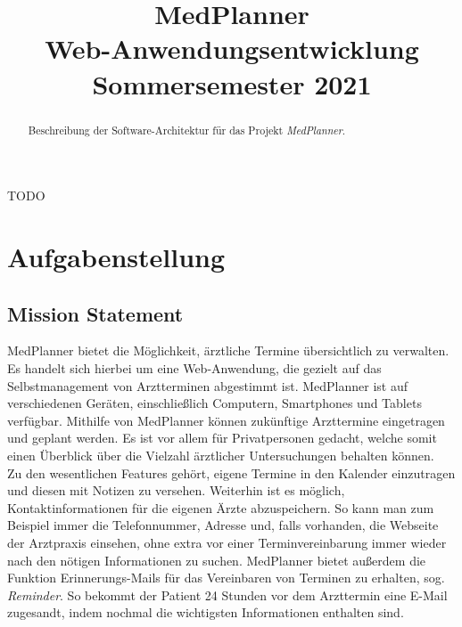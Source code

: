 \documentclass[conference]{IEEEtran}
\begin{document}
\title{MedPlanner\\
{\large Web-Anwendungsentwicklung Sommersemester 2021}
}

\author{
\and
{}
\and
{}
\and
{}
\and
{}
}

\maketitle

\begin{abstract}
Beschreibung der Software-Architektur für das Projekt \textit{MedPlanner}.
\end{abstract}

\begin{IEEEkeywords}
TODO
\end{IEEEkeywords}


\section{Aufgabenstellung}
\subsection{Mission Statement}
MedPlanner bietet die Möglichkeit, ärztliche Termine übersichtlich zu verwalten. Es handelt sich hierbei um eine Web-Anwendung, die gezielt auf das Selbstmanagement von Arztterminen abgestimmt ist. MedPlanner ist auf verschiedenen Geräten, einschließlich Computern, Smartphones und Tablets verfügbar. Mithilfe von MedPlanner können zukünftige Arzttermine eingetragen und geplant werden. Es ist vor allem für Privatpersonen gedacht, welche somit einen Überblick über die Vielzahl ärztlicher Untersuchungen behalten können.\\
Zu den wesentlichen Features gehört, eigene Termine in den Kalender einzutragen und diesen mit Notizen zu versehen. Weiterhin ist es möglich, Kontaktinformationen für die eigenen Ärzte abzuspeichern. So kann man zum Beispiel immer die Telefonnummer, Adresse und, falls vorhanden, die Webseite der Arztpraxis einsehen, ohne extra vor einer Terminvereinbarung immer wieder nach den nötigen Informationen zu suchen. MedPlanner bietet außerdem die Funktion Erinnerungs-Mails für das Vereinbaren von Terminen zu erhalten, sog. \textit{Reminder}. So bekommt der Patient 24 Stunden vor dem Arzttermin eine E-Mail zugesandt, indem nochmal die wichtigsten Informationen enthalten sind. 
\end{document}
